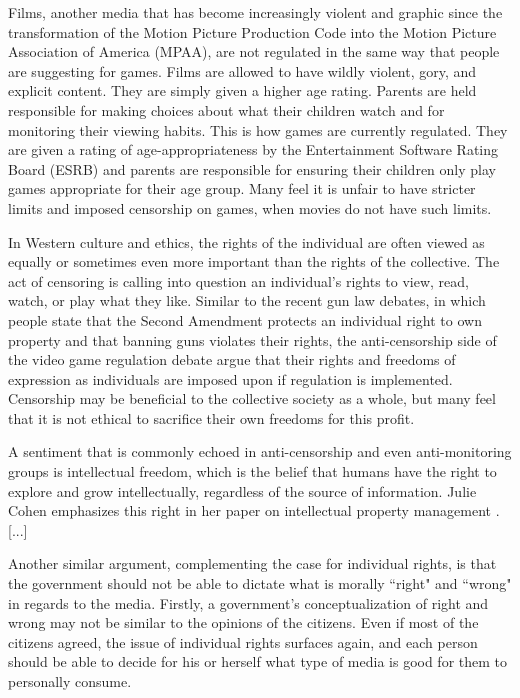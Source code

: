 Films, another media that has become increasingly violent and graphic since the transformation of the Motion Picture Production Code into the Motion Picture Association of America (MPAA), are not regulated in the same way that people are suggesting for games. Films are allowed to have wildly violent, gory, and explicit content. They are simply given a higher age rating. Parents are held responsible for making choices about what their children watch and for monitoring their viewing habits. This is how games are currently regulated. They are given a rating of age-appropriateness by the Entertainment Software Rating Board (ESRB) and parents are responsible for ensuring their children only play games appropriate for their age group. Many feel it is unfair to have stricter limits and imposed censorship on games, when movies do not have such limits.

In Western culture and ethics, the rights of the individual are often viewed as equally or sometimes even more important than the rights of the collective. The act of censoring is calling into question an individual's rights to view, read, watch, or play what they like. Similar to the recent gun law debates, in which people state that the Second Amendment protects an individual right to own property and that banning guns violates their rights, the anti-censorship side of the video game regulation debate argue that their rights and freedoms of expression as individuals are imposed upon if regulation is implemented. Censorship may be beneficial to the collective society as a whole, but many feel that it is not ethical to sacrifice their own freedoms for this profit. 

A sentiment that is commonly echoed in anti-censorship and even anti-monitoring groups is intellectual freedom, which is the belief that humans have the right to explore and grow intellectually, regardless of the source of information. Julie Cohen emphasizes this right in her paper on intellectual property management \cite{cohen1995}. [...]

Another similar argument, complementing the case for individual rights, is that the government should not be able to dictate what is morally ``right" and ``wrong" in regards to the media. Firstly, a government's conceptualization of right and wrong may not be similar to the opinions of the citizens. Even if most of the citizens agreed, the issue of individual rights surfaces again, and each person should be able to decide for his or herself what type of media is good for them to personally consume.


